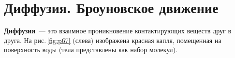 \documentclass[main.tex]{subfiles}
\begin{document}



 

 

 
   

\section{Диффузия. Броуновское движение}


\textbf{Диффузия}~--- это взаимное проникновение контактирующих веществ друг в друга. На рис.\,\ref{fig:p67} (слева) изображена красная капля, помещенная на поверхность воды (тела представлены как набор молекул). 
\end{document}
